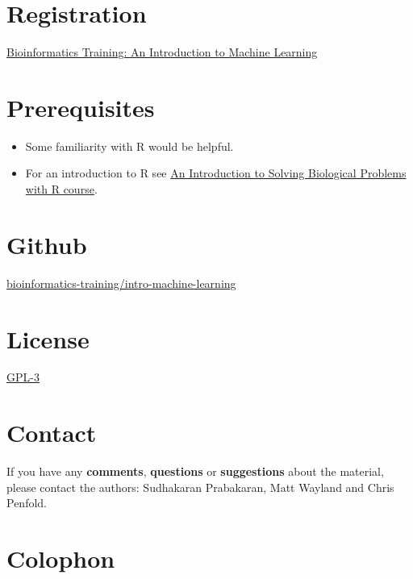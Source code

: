 \documentclass[]{book}
\providecommand{\tightlist}{%
  \setlength{\itemsep}{0pt}\setlength{\parskip}{0pt}}
\theoremstyle{definition}
\theoremstyle{definition}
\theoremstyle{remark}
\begin{document}
\section{Registration}\label{registration}

\href{https://training.csx.cam.ac.uk/bioinformatics/search?type=events\&query=an+introduction+to+machine+learning\&x=0\&y=0}{Bioinformatics
Training: An Introduction to Machine Learning}

\section{Prerequisites}\label{prerequisites}

\begin{itemize}
\tightlist
\item
  Some familiarity with R would be helpful.
\item
  For an introduction to R see
  \href{http://training.csx.cam.ac.uk/bioinformatics/course/bioinfo-rintro/}{An
  Introduction to Solving Biological Problems with R course}.
\end{itemize}

\section{Github}\label{github}

\href{https://github.com/bioinformatics-training/intro-machine-learning}{bioinformatics-training/intro-machine-learning}

\section{License}\label{license}

\href{https://www.gnu.org/licenses/gpl-3.0.en.html}{GPL-3}

\section{Contact}\label{contact}

If you have any \textbf{comments}, \textbf{questions} or
\textbf{suggestions} about the material, please contact the authors:
Sudhakaran Prabakaran, Matt Wayland and Chris Penfold.

\section{Colophon}\label{colophon}
\end{document}
